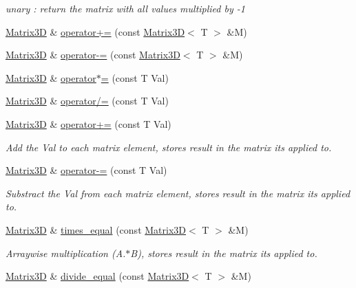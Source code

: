 \begin{DoxyCompactItemize}
\begin{DoxyCompactList}\small\item\em unary \+: return the matrix with all values multiplied by -\/1 \end{DoxyCompactList}\item 
\hyperlink{class_matrix3_d}{Matrix3\+D} \& \hyperlink{class_matrix3_d_a68424be89288793730069618b4ea72f9}{operator+=} (const \hyperlink{class_matrix3_d}{Matrix3\+D}$<$ T $>$ \&M)
\item 
\hyperlink{class_matrix3_d}{Matrix3\+D} \& \hyperlink{class_matrix3_d_ad0c3f843c76a18f238dc010f17d2c347}{operator-\/=} (const \hyperlink{class_matrix3_d}{Matrix3\+D}$<$ T $>$ \&M)
\item 
\hyperlink{class_matrix3_d}{Matrix3\+D} \& \hyperlink{class_matrix3_d_a6813566ad77443bdb08e36e6952ae1f0}{operator$\ast$=} (const T Val)
\item 
\hyperlink{class_matrix3_d}{Matrix3\+D} \& \hyperlink{class_matrix3_d_a4c37d2580e6b18ceb2d31c9651edcae1}{operator/=} (const T Val)
\item 
\hyperlink{class_matrix3_d}{Matrix3\+D} \& \hyperlink{class_matrix3_d_aa5365a674fd6ff9a8a8826253d951cf6}{operator+=} (const T Val)
\begin{DoxyCompactList}\small\item\em Add the Val to each matrix element, stores result in the matrix it\textquotesingle{}s applied to. \end{DoxyCompactList}\item 
\hyperlink{class_matrix3_d}{Matrix3\+D} \& \hyperlink{class_matrix3_d_a245098d64b34dd706368524af27ac332}{operator-\/=} (const T Val)
\begin{DoxyCompactList}\small\item\em Substract the Val from each matrix element, stores result in the matrix it\textquotesingle{}s applied to. \end{DoxyCompactList}\item 
\hyperlink{class_matrix3_d}{Matrix3\+D} \& \hyperlink{class_matrix3_d_a3dfa227d8f3a785f41774aa3fa93f06c}{times\+\_\+equal} (const \hyperlink{class_matrix3_d}{Matrix3\+D}$<$ T $>$ \&M)
\begin{DoxyCompactList}\small\item\em Arraywise multiplication (A.$\ast$\+B), stores result in the matrix it\textquotesingle{}s applied to. \end{DoxyCompactList}\item 
\hyperlink{class_matrix3_d}{Matrix3\+D} \& \hyperlink{class_matrix3_d_a206ed85138499120f59b610aeace4ed1}{divide\+\_\+equal} (const \hyperlink{class_matrix3_d}{Matrix3\+D}$<$ T $>$ \&M)

\end{DoxyCompactItemize}
